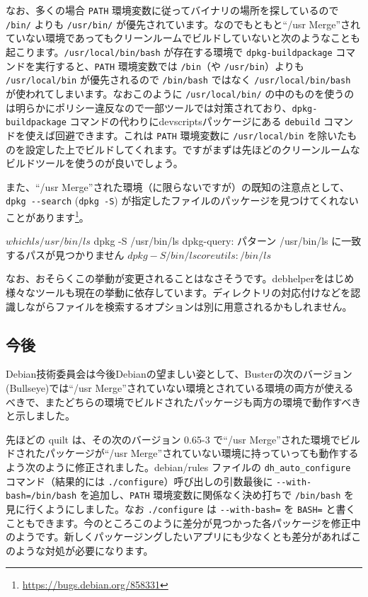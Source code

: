 \documentclass[mingoth,a4paper]{jsarticle}
\begin{document}
なお、多くの場合 \verb|PATH| 環境変数に従ってバイナリの場所を探しているので \verb|/bin/| よりも \verb|/usr/bin/| が優先されています。なのでもともと``/usr Merge''されていない環境であってもクリーンルームでビルドしていないと次のようなことも起こります。\verb|/usr/local/bin/bash| が存在する環境で \verb|dpkg-buildpackage| コマンドを実行すると、\verb|PATH| 環境変数では \verb|/bin|（や \verb|/usr/bin|）よりも \verb|/usr/local/bin| が優先されるので \verb|/bin/bash| ではなく \verb|/usr/local/bin/bash| が使われてしまいます。なおこのように \verb|/usr/local/bin/| の中のものを使うのは明らかにポリシー違反なので一部ツールでは対策されており、\verb|dpkg-buildpackage| コマンドの代わりにdevscriptsパッケージにある \verb|debuild| コマンドを使えば回避できます。これは \verb|PATH| 環境変数に \verb|/usr/local/bin| を除いたものを設定した上でビルドしてくれます。ですがまずは先ほどのクリーンルームなビルドツールを使うのが良いでしょう。

また、``/usr Merge''された環境（に限らないですが）の既知の注意点として、\verb|dpkg --search| (\verb|dpkg -S|) が指定したファイルのパッケージを見つけてくれないことがあります\footnote{\url{https://bugs.debian.org/858331}}。
\begin{commandline}
$ which ls
/usr/bin/ls
$ dpkg -S /usr/bin/ls
dpkg-query: パターン /usr/bin/ls に一致するパスが見つかりません
$ dpkg -S /bin/ls
coreutils: /bin/ls
$ 
\end{commandline}
なお、おそらくこの挙動が変更されることはなさそうです。debhelperをはじめ様々なツールも現在の挙動に依存しています。ディレクトリの対応付けなどを認識しながらファイルを検索するオプションは別に用意されるかもしれません。

\subsection{今後}

Debian技術委員会は今後Debianの望ましい姿として、Busterの次のバージョン(Bullseye)では``/usr Merge''されていない環境とされている環境の両方が使えるべきで、またどちらの環境でビルドされたパッケージも両方の環境で動作すべきと示しました。

先ほどの quilt は、その次のバージョン 0.65-3 で``/usr Merge''された環境でビルドされたパッケージが``/usr Merge''されていない環境に持っていっても動作するよう次のように修正されました。debian/rules ファイルの \verb|dh_auto_configure| コマンド（結果的には \verb|./configure|）呼び出しの引数最後に \verb|--with-bash=/bin/bash| を追加し、\verb|PATH| 環境変数に関係なく決め打ちで \verb|/bin/bash| を見に行くようにしました。なお \verb|./configure| は \verb|--with-bash=| を \verb|BASH=| と書くこともできます。今のところこのように差分が見つかった各パッケージを修正中のようです。新しくパッケージングしたいアプリにも少なくとも差分があればこのような対処が必要になります。
\end{document}
